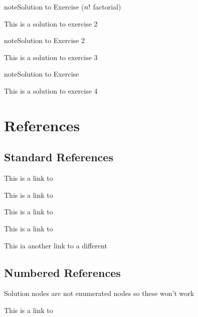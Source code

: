 \begin{sphinxadmonition}{note}{Solution to Exercise (\protect\(n!\protect\) factorial)}



\sphinxAtStartPar
This is a solution to exercise 2
\end{sphinxadmonition}
 \label{solution:solution-3}

\begin{sphinxadmonition}{note}{Solution to Exercise 2}



\sphinxAtStartPar
This is a solution to exercise 3
\end{sphinxadmonition}
 \label{solution:solution-4}

\begin{sphinxadmonition}{note}{Solution to Exercise}



\sphinxAtStartPar
This is a solution to exercise 4
\end{sphinxadmonition}


\section{References}
\label{\detokenize{solution:references}}

\subsection{Standard References}
\label{\detokenize{solution:standard-references}}
\sphinxAtStartPar
This is a link to {\hyperref[\detokenize{solution:solution-1}]{}}

\sphinxAtStartPar
This is a link to {\hyperref[\detokenize{solution:solution-2}]{}}

\sphinxAtStartPar
This is a link to {\hyperref[\detokenize{solution:solution-3}]{}}

\sphinxAtStartPar
This is a link to {\hyperref[\detokenize{solution:solution-4}]{}}

\sphinxAtStartPar
This ia another link to a different {\hyperref[\detokenize{solution:solution-1}]{}}


\subsection{Numbered References}
\label{\detokenize{solution:numbered-references}}
\sphinxAtStartPar
Solution nodes are not enumerated nodes so these won’t work

\sphinxAtStartPar
This is a link to 



\renewcommand{\indexname}{Index}
\printindex
